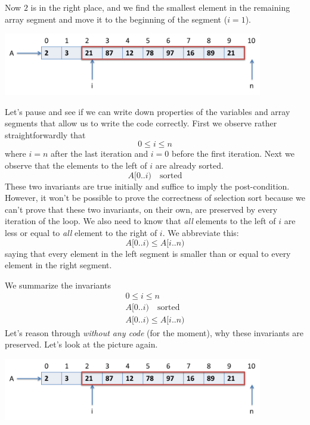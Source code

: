 Now $2$ is in the right place, and we find the smallest element in the
remaining array segment and move it to the beginning of the segment
($i = 1$).

\clearpage
\begin{center}
\includegraphics[width=0.85\textwidth]{img/selsort3.png}
\end{center}

Let's pause and see if we can write down properties of the variables
and array segments that allow us to write the code correctly.  First
we observe rather straightforwardly that
$$
0 \leq i \leq n
$$
where $i = n$ after the last iteration and $i = 0$ before the first
iteration.  Next we observe that the elements to the left of $i$
are already sorted.
$$
A\lbrack 0{..}i)\quad \mbox{sorted}
$$
These two invariants are true initially and suffice to imply the
post-condition. However, it won't be possible to prove the correctness
of selection sort because we can't prove that these two invariants, on
their own, are preserved by every iteration of the loop.  We also need
to know that \emph{all} elements to the left of $i$ are less or equal
to \emph{all} element to the right of $i$.  We abbreviate this:
$$
A\lbrack 0{..}i) \leq A\lbrack i{..}n)
$$
saying that every element in the left segment is smaller than or equal
to every element in the right segment.

\clearpage
We summarize the invariants
$$
\begin{array}{l}
   0 \leq i \leq n
\\ A\lbrack 0{..}i)\quad \text{sorted}
\\ A\lbrack 0{..}i) \leq A\lbrack i{..}n)
\end{array}
$$
Let's reason through \emph{without any code} (for the moment), why
these invariants are preserved.
Let's look at the picture again.
\begin{center}
\includegraphics[width=0.85\textwidth]{img/selsort3.png}
\end{center}

